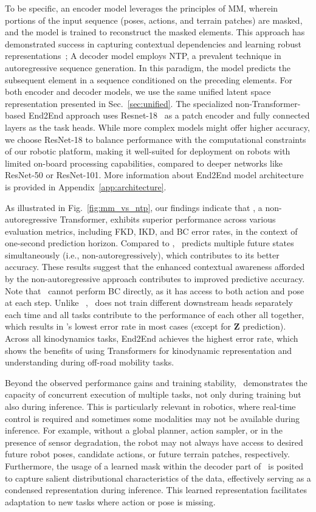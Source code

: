 To be specific, an encoder model leverages the principles of MM, wherein portions of the input sequence (poses, actions, and terrain patches) are masked, and the model is trained to reconstruct the masked elements. This approach has demonstrated success in capturing contextual dependencies and learning robust representations~\cite{nazeri2024vertiencoder};
A decoder model employs NTP, a prevalent technique in autoregressive sequence generation. In this paradigm, the model predicts the subsequent element in a sequence conditioned on the preceding elements. For both encoder and decoder models, we use the same unified latent space representation presented in Sec.~\ref{sec:unified}. The specialized non-Transformer-based End2End approach uses Resnet-18~\cite{he2015deep} as a patch encoder and fully connected layers as the task heads. While more complex models might offer higher accuracy, we choose ResNet-18 to balance performance with the computational constraints of our robotic platform, making it well-suited for deployment on robots with limited on-board processing capabilities, compared to deeper networks like ResNet-50 or ResNet-101. More information about End2End model architecture is provided in Appendix~\ref{app:architecture}.


As illustrated in Fig.~\ref{fig:mm_vs_ntp}, our findings indicate that \former, a non-autoregressive Transformer, exhibits superior performance across various evaluation metrics, including FKD, IKD, and BC error rates, in the context of one-second prediction horizon. Compared to \vertidecoder, \former~predicts multiple future states simultaneously (i.e., non-autoregressively), which contributes to its better accuracy. These results suggest that the enhanced contextual awareness afforded by the non-autoregressive approach contributes to improved predictive accuracy. Note that \vertidecoder~cannot perform BC directly, as it has access to both action and pose at each step. Unlike \coder~\cite{nazeri2024vertiencoder}, \former~does not train different downstream heads separately each time and all tasks contribute to the performance of each other all together, which results in \former's lowest error rate in most cases (except for $\mathbf{Z}$ prediction). 
Across all kinodynamics tasks, End2End achieves the highest error rate, which shows the benefits of using Transformers for kinodynamic representation and understanding during off-road mobility tasks. 

Beyond the observed performance gains and training stability, \former~demonstrates the capacity of concurrent execution of multiple tasks, not only during training but also during inference. This is particularly relevant in robotics, where real-time control is required and sometimes some modalities may not be available during inference. For example, without a global planner, action sampler, or in the presence of sensor degradation, the robot may not always have access to desired future robot poses, candidate actions, or future terrain patches, respectively. 
Furthermore, the usage of a learned mask within the decoder part of \former~is posited to capture salient distributional characteristics of the data, effectively serving as a condensed representation during inference. This learned representation facilitates adaptation to new tasks where action or pose is missing.

